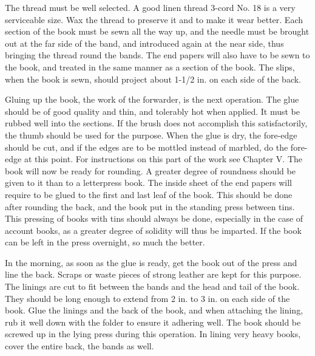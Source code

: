 \documentclass[twoside]{book}
\begin{document}
The thread must be well selected. A good linen
thread 3-cord No. 18 is a very serviceable size. Wax
the thread to preserve it and to make it wear better.
Each section of the book must be sewn all the way
up, and the needle must be brought out at the far
side of the band, and introduced again at the near
side, thus bringing the thread round the bands.
The end papers will also have to be sewn to the
book, and treated in the same manner as a section
of the book. The slips, when the book is sewn,
should project about 1-1/2 in. on each side of the
back.

Gluing up the book, the work of the forwarder,
is the next operation. The glue should be of good
quality and thin, and tolerably hot when applied.
It must be rubbed well into the sections. If the
brush does not accomplish this satisfactorily, the
thumb should be used for the purpose. When the
glue is dry, the fore-edge should be cut, and if the
edges are to be mottled instead of marbled, do the
fore-edge at this point. For instructions on this
part of the work see Chapter V. The book will
\pagebreak
now be ready for rounding. A greater degree of
roundness should be given to it than to a
letterpress book. The inside sheet of the end papers
will require to be glued to the first and last leaf of
the book. This should be done after rounding the
back, and the book put in the standing press between
tins. This pressing of books with tins should
always be done, especially in the case of account
books, as a greater degree of solidity will thus be
imparted. If the book can be left in the press
overnight, so much the better.

In the morning, as soon as the glue is ready,
get the book out of the press and line the back.
Scraps or waste pieces of strong leather are kept for
this purpose. The linings are cut to fit between the
bands and the head and tail of the book. They
should be long enough to extend from 2 in. to 3 in.
on each side of the book. Glue the linings and the
back of the book, and when attaching the lining,
rub it well down with the folder to ensure it
adhering well. The book should be screwed up in the
lying press during this operation. In lining very
heavy books, cover the entire back, the bands as
well.
\end{document}
